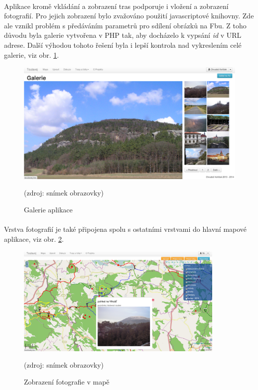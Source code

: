 \documentclass[11pt,a4paper,titlepage,oneside]{book}
\begin{document}
			\paragraph{} Aplikace kromě vkládání a zobrazení tras podporuje i vložení a zobrazení fotografií. Pro jejich zobrazení bylo zvažováno použití javascriptové knihovny. Zde ale vznikl problém s předáváním parametrů pro sdílení obrázků na \acl{Fb}u. Z toho důvodu byla galerie vytvořena v PHP tak, aby docházelo k vypsání \textit{id} v URL adrese. Další výhodou tohoto řešení byla i lepší kontrola nad vykreslením celé galerie, viz obr. \ref{fig:gallery}.
		\begin{figure}[!h]
			\begin{center}
				\includegraphics[width=12cm]{obrazky/toulavej/gallery.png}
				\caption{Galerie aplikace }
				\label{fig:gallery}
				(zdroj: snímek obrazovky)
			\end{center}
		\end{figure}
			\paragraph{} Vrstva fotografií je také připojena spolu s ostatními vrstvami do hlavní mapové aplikace, viz obr. \ref{fig:vlhost}.

		\begin{figure}[!h]
			\begin{center}
				\includegraphics[width=10cm]{obrazky/toulavej/mapa2_vlhost.png}
				\caption{Zobrazení fotografie v mapě}
				\label{fig:vlhost}
				(zdroj: snímek obrazovky)
			\end{center}
		\end{figure}	
\end{document}

